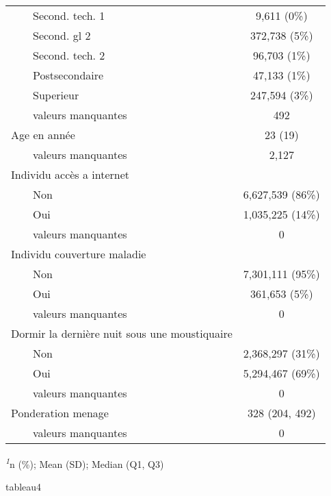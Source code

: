 \documentclass[
]{article}
\newenvironment{Shaded}{\begin{snugshade}}{\end{snugshade}}
\newcommand{\NormalTok}[1]{#1}
\begin{document}
\begin{table}[!t]
\begin{tabular*}{\linewidth}{@{\extracolsep{\fill}}lc}
    Second. tech. 1 & 9,611 (0\%) \\ 
    Second. gl 2 & 372,738 (5\%) \\ 
    Second. tech. 2 & 96,703 (1\%) \\ 
    Postsecondaire & 47,133 (1\%) \\ 
    Superieur & 247,594 (3\%) \\ 
    valeurs manquantes & 492 \\ 
Age en année & 23 (19) \\ 
    valeurs manquantes & 2,127 \\ 
Individu accès a internet &  \\ 
    Non & 6,627,539 (86\%) \\ 
    Oui & 1,035,225 (14\%) \\ 
    valeurs manquantes & 0 \\ 
Individu couverture maladie &  \\ 
    Non & 7,301,111 (95\%) \\ 
    Oui & 361,653 (5\%) \\ 
    valeurs manquantes & 0 \\ 
Dormir la dernière nuit sous une moustiquaire &  \\ 
    Non & 2,368,297 (31\%) \\ 
    Oui & 5,294,467 (69\%) \\ 
    valeurs manquantes & 0 \\ 
Ponderation menage & 328 (204, 492) \\ 
    valeurs manquantes & 0 \\ 
\bottomrule
\end{tabular*}
\begin{minipage}{\linewidth}
\textsuperscript{\textit{1}}n (\%); Mean (SD); Median (Q1, Q3)\\
\end{minipage}
\end{table}

\begin{Shaded}
\begin{Highlighting}[]
\NormalTok{tableau4}
\end{Highlighting}
\end{Shaded}
\end{document}
